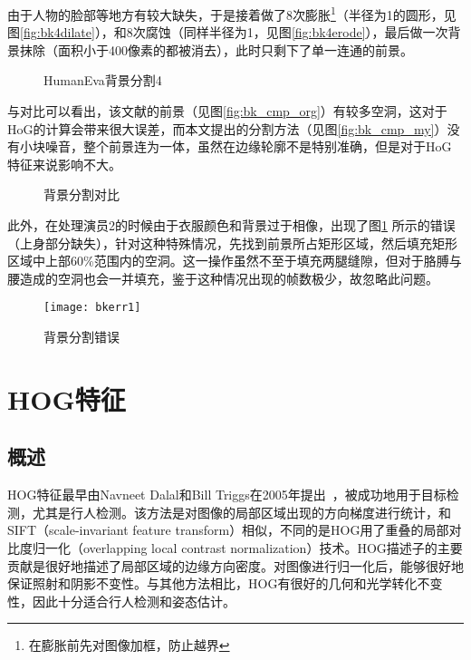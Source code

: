 由于人物的脸部等地方有较大缺失，于是接着做了8次膨胀\footnote{在膨胀前先对图像加框，防止越界}（半径为1的圆形，见图\ref{fig:bk4dilate}），和8次腐蚀（同样半径为1，见图\ref{fig:bk4erode}），最后做一次背景抹除（面积小于400像素的都被消去），此时只剩下了单一连通的前景。

\begin{figure}[htbp]
  \centering
  \hspace{1cm}
  \caption{HumanEva背景分割4}
\end{figure}

与\cite{Poppe2007}对比可以看出，该文献的前景（见图\ref{fig:bk_cmp_org}）有较多空洞，这对于HoG的计算会带来很大误差，而本文提出的分割方法（见图\ref{fig:bk_cmp_my}）没有小块噪音，整个前景连为一体，虽然在边缘轮廓不是特别准确，但是对于HoG特征来说影响不大。

\begin{figure}[htbp]
  \centering
  \hspace{1cm}
  \hspace{1cm}
  \caption{背景分割对比}
\end{figure}

此外，在处理演员2的时候由于衣服颜色和背景过于相像，出现了图\ref{fig:bkerr} 所示的错误（上身部分缺失），针对这种特殊情况，先找到前景所占矩形区域，然后填充矩形区域中上部60\%范围内的空洞。这一操作虽然不至于填充两腿缝隙，但对于胳膊与腰造成的空洞也会一并填充，鉴于这种情况出现的帧数极少，故忽略此问题。

\begin{figure}[htbp]
  \centering
  \texttt{[image: bkerr1]}
  \caption{背景分割错误}\label{fig:bkerr}
\end{figure}

\section{HOG特征}
\subsection{概述}
HOG特征最早由Navneet Dalal和Bill Triggs在2005年提出~\cite{Dalal05histogramsof}，被成功地用于目标检测，尤其是行人检测。该方法是对图像的局部区域出现的方向梯度进行统计，和SIFT（scale-invariant feature transform）相似，不同的是HOG用了重叠的局部对比度归一化（overlapping local contrast normalization）技术。HOG描述子的主要贡献是很好地描述了局部区域的边缘方向密度。对图像进行归一化后，能够很好地保证照射和阴影不变性。与其他方法相比，HOG有很好的几何和光学转化不变性，因此十分适合行人检测和姿态估计。

